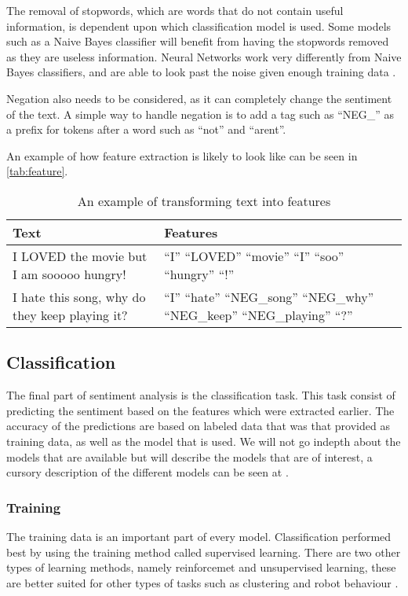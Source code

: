 The removal of stopwords, which are words that do not contain useful
information, is dependent upon which classification model is used. Some models
such as a Naive Bayes classifier will benefit from having the stopwords removed
as they are useless information. Neural Networks work very differently from
Naive Bayes classifiers, and are able to look past the noise given enough
training data \Source.\nl

Negation also needs to be considered, as it can completely change the sentiment
of the text. A simple way to handle negation is to add a tag such as ``NEG\_'' as
a prefix for tokens after a word such as ``not'' and ``arent''.\nl 

An example of how feature extraction is likely to look like can be seen in
\autoref{tab:feature}.

\begin{table}[H]
\centering
\begin{tabular}{|p{6cm}|p{8cm}|}
\hline
Text & Features \\ \hline
I LOVED the movie but I am sooooo hungry! & 
``I'' ``LOVED'' ``movie'' ``I'' ``soo'' ``hungry'' ``!''
\\ \hline 
I hate this song, why do they keep playing it? &
``I'' ``hate'' ``NEG\_song'' ``NEG\_why'' ``NEG\_keep'' ``NEG\_playing'' ``?''  
\\ \hline
\end{tabular}
\caption{An example of transforming text into features}
\label{tab:feature}
\end{table}


\subsection{Classification}

The final part of sentiment analysis is the classification task. This task
consist of predicting the sentiment based on the features which were extracted
earlier. The accuracy of the predictions are based on labeled data that was that
provided as training data, as well as the model that is used. We will not go
indepth about the models that are available but will describe the models that
are of interest, a cursory description of the different models can be seen at
\citep{Classification}.

\subsubsection{Training}
The training data is an important part of every model. Classification
performed best by using the training method called supervised learning.
There are two other types of learning methods, namely reinforcemet and
unsupervised learning, these are better suited for other types of tasks such as
clustering and robot behaviour \Source.

